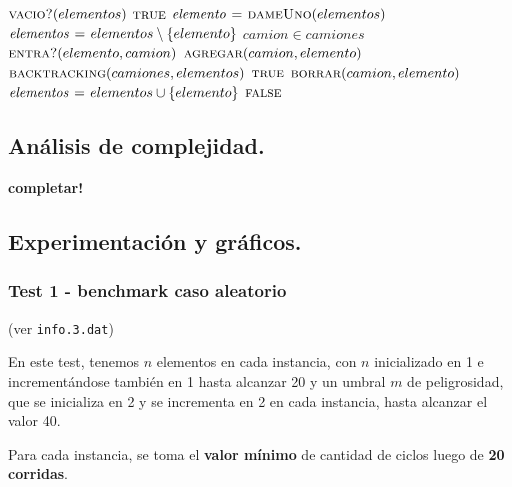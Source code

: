 \vspace*{0.5cm}


\begin{codebox}
\li \If $\textnormal{\scshape vacio?}(elementos)$
\li     \Then
            \Return $\textnormal{\scshape true}$
        \End
\li $\id{elemento} \gets \proc{dameUno}(elementos)$
\li $\id{elementos} \gets elementos \setminus \{elemento\}$
\li \For $camion \in camiones$
\li     \Do
            \If $\textnormal{\scshape entra?}(elemento, camion)$
\li             \Then
                    $\textnormal{\scshape agregar}(camion, elemento)$
\li                 \If $\textnormal{\scshape backtracking}(camiones, elementos)$
                        \Then
\li                         \Return $\textnormal{\scshape true}$
\li                 \Else
\li                     $\textnormal{\scshape borrar}(camion, elemento)$
                    \End
            \End
        \End
\li $\id{elementos} \gets elementos \cup \{elemento\}$
\li \Return $\textnormal{\scshape false}$
\end{codebox}



\newpage
\subsection{Análisis de complejidad.}

\vspace*{0.3cm}

\textbf{completar!}


\newpage
\subsection{Experimentación y gráficos.}

\vspace*{0.3cm}

\subsubsection{Test 1 - benchmark caso aleatorio}

(ver \verb|info.3.dat|) \medskip

En este test, tenemos $n$ elementos en cada instancia, con $n$ inicializado en 1 e incrementándose
también en 1 hasta alcanzar 20 y un umbral $m$ de peligrosidad, que se inicializa en 2 y se incrementa
en 2 en cada instancia, hasta alcanzar el valor 40.

Para cada instancia, se toma el \textbf{valor mínimo} de cantidad de ciclos luego de \textbf{20 corridas}.

